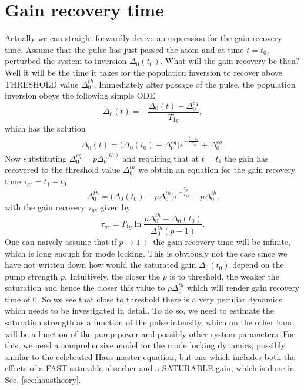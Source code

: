 \documentclass[preprint,secnumarabic,amssymb, nobibnotes, aip, prd]{revtex4-1}
\begin{document}
\section{Gain recovery time}
Actually we can straight-forwardly derive an expression for the gain recovery time. Assume that the pulse has just passed the atom and at time $t=t_0$, perturbed the system to inversion $\Delta_0(t_0)$. What will the gain recovery be then? Well it will be the time it takes for the population inversion to recover above THRESHOLD value $\Delta_{0}^{th}$. Immediately after passage of the pulse, the population inversion obeys the following simple ODE
\begin{equation}
\dot\Delta_0(t) = -\frac{\Delta_0(t) -\Delta_0^{eq}}{T_{1g}},
\end{equation}    
which has the solution 
\begin{eqnarray}
\Delta_0(t) = \big(\Delta_0(t_0) -\Delta_0^{eq}\big)e^{-\frac{t-t_0}{T_{1g}}}+\Delta_0^{eq}.
\end{eqnarray}
Now substituting $\Delta_0^{eq} = p\Delta_0^{(th)}$ and requiring that at $t=t_1$ the gain has recovered to the threshold value $\Delta_0^{th}$ we obtain an equation for the gain recovery time $\tau_{gr} = t_1-t_0$ 
\begin{equation}
\Delta_{0}^{th} = \big(\Delta_0(t_0) - p\Delta_0^{th}\big)e^{-\frac{\tau_{gr}}{T_{1g}}}+p\Delta_0^{th}.
\end{equation}
with the gain recovery $\tau_{gr} $ given by
\begin{equation}\label{eq:gainrecovery1}
\tau_{gr} = T_{1g} \ln\frac{p\Delta_0^{th}-\Delta_0(t_0)}{\Delta_0^{th}(p-1)}.
\end{equation}
One can naively assume that if $p\to1+$ the gain recovery time will be infinite, which is long enough for mode locking. This is obviously not the case since we have not written down how would the saturated gain $\Delta_0(t_0)$ depend on the pump strength $p$. Intuitively, the closer the $p$ is to threshold, the weaker the saturation and hence the closer this value to $p\Delta_0^{th}$ which will render gain recovery time of 0. So we see that close to threshold there is a very peculiar dynamics which needs to be investigated in detail. To do so, we need to estimate the saturation strength as a function of the pulse intensity, which on the other hand will be a function of the pump power and possibly other system parameters. For this, we need a comprehensive model for the mode locking dynamics, possibly similar to the celebrated Haus master equation, but one which includes both the effects of a FAST saturable absorber and a SATURABLE gain, which is done in Sec. \ref{sec:haustheory}. 
\end{document}
